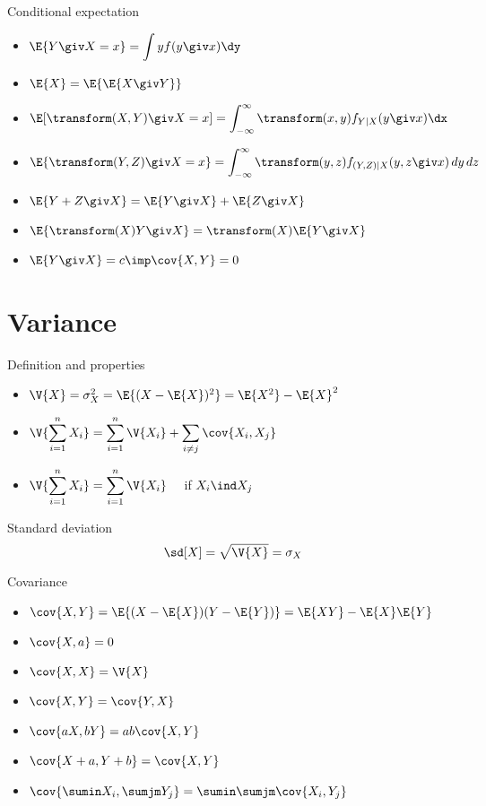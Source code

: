 \documentclass[landscape]{article}
\newenvironment{titemize}[1]{
  \begin{minipage}[h]{\columnwidth}
    #1
    \begin{itemize}
}{
    \end{itemize}
  \end{minipage}
}
\begin{document}
\begin{multicols*}{2}
\begin{titemize}{Conditional expectation}
  \item $\E{Y\giv X=x} = \displaystyle\int y f(y\giv x)\dy$
  \item $\E{X} = \E{\E{X\giv Y}}$
  \item $\E[\transform(X,Y)\giv X=x]
    = \displaystyle\int_{-\infty}^\infty \transform(x,y)f_{Y|X}(y\giv x)\dx$
  \item $\E{\transform(Y,Z)\giv X=x} =
    \displaystyle\int_{-\infty}^\infty\transform(y,z)
    f_{(Y,Z)|X}(y,z\giv x)\,dy\,dz$
  \item $\E{Y+Z\giv X} = \E{Y\giv X} + \E{Z\giv X}$
  \item $\E{\transform(X)Y\giv X} = \transform(X)\E{Y\giv X}$
  \item $\E{Y\giv X} = c \imp \cov{X,Y}=0$
\end{titemize}

\section{Variance}

\begin{titemize}{Definition and properties}
  \item $\V{X} = \sigma_X^2 = \E{(X-\E{X})^2} = \E{X^2} - \E{X}^2$
  \item $\V{\displaystyle\sum_{i=1}^n X_i} =
    \displaystyle\sum_{i=1}^n \V{X_i} + \sum_{i\ne j}\cov{X_i,X_j}$
  \item $\V{\displaystyle\sum_{i=1}^n X_i} =
    \displaystyle\sum_{i=1}^n\V{X_i} \quad$ if $X_i \ind X_j$
\end{titemize}

Standard deviation
\[\sd[X] = \sqrt{\V{X}} = \sigma_X\]

Covariance
\begin{itemize}
  \item $\cov{X,Y} = \E{(X-\E{X})(Y-\E{Y})} = \E{XY}-\E{X}\E{Y}$
  \item $\cov{X,a} = 0$
  \item $\cov{X,X} = \V{X}$
  \item $\cov{X,Y} = \cov{Y,X}$
  \item $\cov{aX,bY} = ab\cov{X,Y}$
  \item $\cov{X+a,Y+b} = \cov{X,Y}$
  \item $\cov{\displaystyle\sumin X_i, \sumjm Y_j}
    = \displaystyle\sumin\sumjm\cov{X_i, Y_j}$
\end{itemize}


\end{multicols*}
\end{document}
